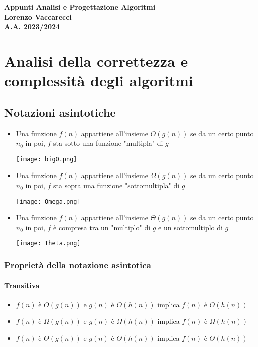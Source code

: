 \documentclass[12pt, a4paper]{report}
\begin{document}
\begin{titlepage}
    \centering
    \vfill
    {\bfseries\Huge
        Appunti Analisi e Progettazione Algoritmi\\
        \vskip1cm
        \Large
        Lorenzo Vaccarecci\\
        \vskip1cm
        \normalsize
        A.A. 2023/2024
    }
    \vfill
    \vfill
    \vfill
\end{titlepage}
\tableofcontents
\chapter{Analisi della correttezza e complessità degli algoritmi}
\section{Notazioni asintotiche}
\begin{itemize}
    \item Una funzione $f(n)$ appartiene all'insieme $O(g(n))$ se da un certo punto $n_{0}$ in poi, $f$ sta sotto una funzione "multipla" di $g$ \begin{center}
        \texttt{[image: bigO.png]}
    \end{center}
    \item Una funzione $f(n)$ appartiene all'insieme $\Omega(g(n))$ se da un certo punto $n_{0}$ in poi, $f$ sta sopra una funzione "sottomultipla" di $g$ \begin{center}
        \texttt{[image: Omega.png]}
    \end{center}
    \item Una funzione $f(n)$ appartiene all'insieme $\Theta(g(n))$ se da un certo punto $n_{0}$ in poi, $f$ è compresa tra un "multiplo" di $g$ e un sottomultiplo di $g$ \begin{center}
        \texttt{[image: Theta.png]}
    \end{center}
\end{itemize}
\subsection{Proprietà della notazione asintotica}
\subsubsection{Transitiva}
\begin{itemize}
    \item $f(n)$ è $O(g(n))$ e $g(n)$ è $O(h(n))$ implica $f(n)$ è $O(h(n))$
    \item $f(n)$ è $\Omega(g(n))$ e $g(n)$ è $\Omega(h(n))$ implica $f(n)$ è $\Omega(h(n))$
    \item $f(n)$ è $\Theta(g(n))$ e $g(n)$ è $\Theta(h(n))$ implica $f(n)$ è $\Theta(h(n))$
\end{itemize}
\end{document}
